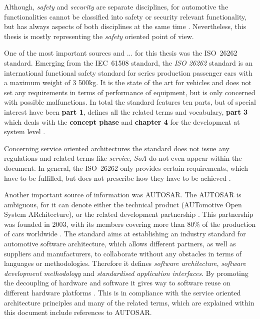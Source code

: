 Although, \emph{safety} and \emph{security} are separate disciplines, for automotive the functionalities cannot be classified into safety or security relevant functionality, but has always aspects of both disciplines at the same time \cite{nilsson2008}. Nevertheless, this thesis is mostly representing the \emph{safety} oriented point of view.



One of the most important sources and ... for this thesis was the \mbox{ISO 26262} standard. Emerging from the \mbox{IEC 61508} standard, the \emph{ISO 26262} standard is an international functional safety standard for series production passenger cars with a maximum weight of 3 500kg. It is the state of the art for vehicles and does not set any requirements in terms of performance of equipment, but is only concerned with possible malfunctions. In total the standard features ten parts, but of special interest have been \textbf{part 1}, defines all the related terms and vocabulary, \textbf{part 3} which deals with the \textbf{concept phase} and \textbf{chapter 4} for the development at system level \cite{iso26262:1} \cite{iso26262:3} \cite{iso26262:4}.

Concerning service oriented architectures the standard does not issue any regulations and related terms like \emph{service}, \emph{SoA} do not even appear within the document. In general, the \mbox{ISO 26262} only provides certain requirements, which have to be fulfilled, but does not prescribe how they have to be achieved \cite{iso26262:course1}.

Another important source of information was AUTOSAR. The AUTOSAR is ambiguous, for it can denote either the technical product (AUTomotive Open System ARchitecture), or the related development partnership \cite{autosar_rs_main}. This partnership was founded in 2003, with its members covering more than 80\% of the production of cars worldwide \cite{kirschke_biller2011} \cite{schmerler2012}. The standard aims at establishing an industry standard for automotive software architecture, which allows different partners, as well as suppliers and manufacturers, to collaborate without any obstacles in terms of languages or methodologies. Therefore it defines \emph{software architecture}, \emph{software development methodology} and \emph{standardised application interfaces}. By promoting the decoupling of hardware and software it gives way to software reuse on different hardware platforms \cite{kirschke_biller2011} \cite{schmerler2012}. This is in compliance with the service oriented architecture principles and many of the related terms, which are explained within this document include references to AUTOSAR.

